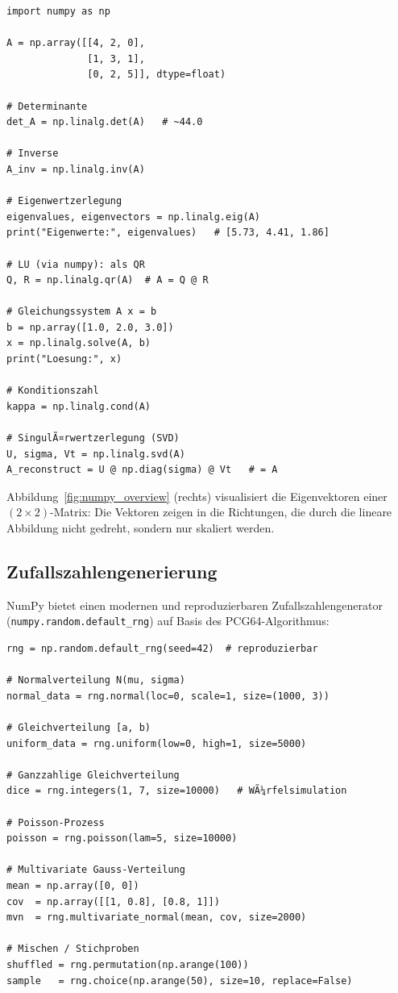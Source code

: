 \documentclass[12pt, a4paper]{article}
\begin{document}
\begin{lstlisting}[caption={Lineare Algebra: Eigenwerte, Matrixoperationen}]
import numpy as np

A = np.array([[4, 2, 0],
              [1, 3, 1],
              [0, 2, 5]], dtype=float)

# Determinante
det_A = np.linalg.det(A)   # ~44.0

# Inverse
A_inv = np.linalg.inv(A)

# Eigenwertzerlegung
eigenvalues, eigenvectors = np.linalg.eig(A)
print("Eigenwerte:", eigenvalues)   # [5.73, 4.41, 1.86]

# LU (via numpy): als QR
Q, R = np.linalg.qr(A)  # A = Q @ R

# Gleichungssystem A x = b
b = np.array([1.0, 2.0, 3.0])
x = np.linalg.solve(A, b)
print("Loesung:", x)

# Konditionszahl
kappa = np.linalg.cond(A)

# SingulÃ¤rwertzerlegung (SVD)
U, sigma, Vt = np.linalg.svd(A)
A_reconstruct = U @ np.diag(sigma) @ Vt   # = A
\end{lstlisting}

Abbildung~\ref{fig:numpy_overview} (rechts) visualisiert die Eigenvektoren
einer $(2\times2)$-Matrix: Die Vektoren zeigen in die Richtungen, die durch
die lineare Abbildung nicht gedreht, sondern nur skaliert werden.

\subsection{Zufallszahlengenerierung}
\label{subsec:numpy-random}

NumPy bietet einen modernen und reproduzierbaren Zufallszahlengenerator
(\texttt{numpy.random.\allowbreak{}default\_rng}) auf Basis des PCG64-Algorithmus:

\begin{lstlisting}[caption={Zufallsverteilungen mit NumPy}]
rng = np.random.default_rng(seed=42)  # reproduzierbar

# Normalverteilung N(mu, sigma)
normal_data = rng.normal(loc=0, scale=1, size=(1000, 3))

# Gleichverteilung [a, b)
uniform_data = rng.uniform(low=0, high=1, size=5000)

# Ganzzahlige Gleichverteilung
dice = rng.integers(1, 7, size=10000)   # WÃ¼rfelsimulation

# Poisson-Prozess
poisson = rng.poisson(lam=5, size=10000)

# Multivariate Gauss-Verteilung
mean = np.array([0, 0])
cov  = np.array([[1, 0.8], [0.8, 1]])
mvn  = rng.multivariate_normal(mean, cov, size=2000)

# Mischen / Stichproben
shuffled = rng.permutation(np.arange(100))
sample   = rng.choice(np.arange(50), size=10, replace=False)
\end{lstlisting}
\end{document}
